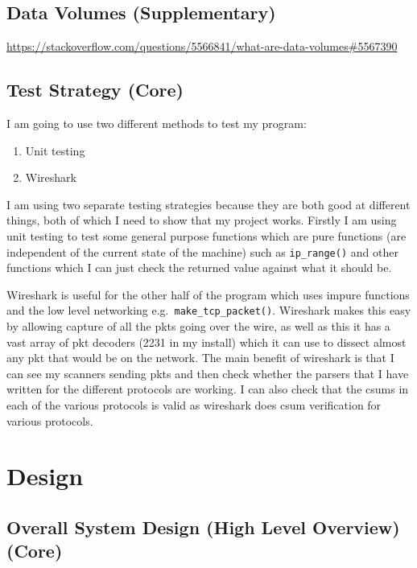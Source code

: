 \documentclass[titlepage]{article}
\let\Oldsection\section{}
\renewcommand{\section}{\FloatBarrier\Oldsection}
\let\Oldsubsection\subsection{}
\renewcommand{\subsection}{\FloatBarrier\Oldsubsection}
\begin{document}
\subsection{Data Volumes (Supplementary)}

\textbf{\color{red}{This seems to be about the volume of data stored in a database.}}
\href{https://stackoverflow.com/questions/5566841/what-are-data-volumes#5567390}{https://stackoverflow.com/questions/5566841/what-are-data-volumes\#5567390}

\subsection{Test Strategy (Core)}

I am going to use two different methods to test my program:
\begin{enumerate}
\item{Unit testing}
\item{Wireshark}
\end{enumerate}
I am using two separate testing strategies because they are both good at different things,
both of which I need to show that my project works. Firstly I am using unit testing to test
some general purpose functions which are pure functions (are independent of the current state
of the machine) such as \verb|ip_range()| and other functions which I can
just check the returned value against what it should be.

Wireshark is useful for the other half of the program which uses impure functions and the
low level networking e.g.\ \verb|make_tcp_packet()|. Wireshark makes this easy by allowing capture of all
the \glspl{pkt} going over the wire, as well as this it has a vast array of \gls{pkt} decoders (2231 in my install)
which it can use to dissect almost any \gls{pkt} that would be on the network. The main
benefit of wireshark is that I can see my scanners sending \glspl{pkt} and then check whether the parsers
that I have written for the different protocols are working. I can also check that the \glspl{csum}
in each of the various protocols is valid as wireshark does \gls{csum} verification for various protocols.

\section{Design}

\subsection{Overall System Design (High Level Overview) (Core)}
\end{document}
